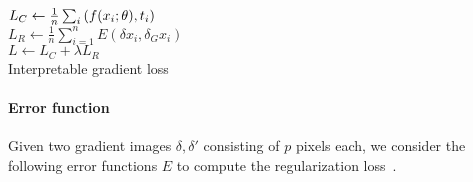 \begin{algorithm}[H]    
	\newcommand{\commentsty}[1]{{\color{DarkGreen}#1}}


	$L_C \gets \frac{1}{n} \sum_i \ce(f(x_i; \theta), t_i)$  \\
   $L_R \gets \frac{1}{n} \sum_{i=1}^n E(\delta x_i, \delta_G x_i) $ \\
   $L \gets L_C + \lambda L_R$
  \\

\caption{Interpretable gradient loss}
\label{alg:grad}
\end{algorithm}

\paragraph{Error function}

Given two gradient images $\delta, \delta'$ consisting of $p$ pixels each, we consider the 
following error functions $E$ to compute the regularization loss~.




